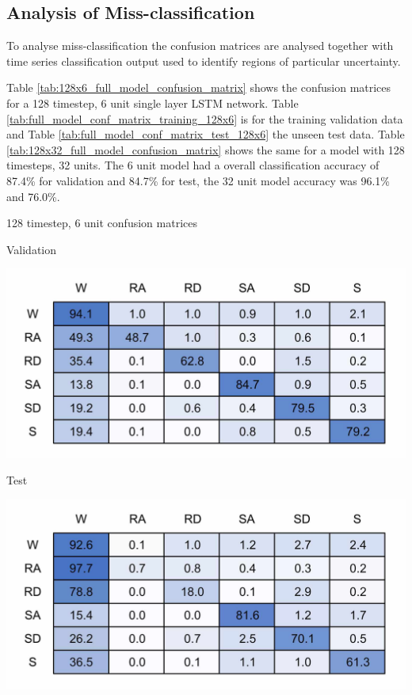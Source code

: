 \documentclass[sensors,article,submit,moreauthors,pdftex]{Definitions/mdpi}
\begin{document}
\subsection{Analysis of Miss-classification}

To analyse miss-classification the confusion matrices are analysed together with time series classification output used to identify regions of particular uncertainty.

Table \ref{tab:128x6_full_model_confusion_matrix} shows the confusion matrices for a 128 timestep, 6 unit single layer LSTM network. Table \ref{tab:full_model_conf_matrix_training_128x6} is for the training validation data and Table \ref{tab:full_model_conf_matrix_test_128x6} the unseen test data. Table \ref{tab:128x32_full_model_confusion_matrix} shows the same for a model with 128 timesteps, 32 units. The 6 unit model had a overall classification accuracy of 87.4\% for validation and 84.7\% for test, the 32 unit model accuracy was 96.1\% and 76.0\%.

\begin{table}[!hbt]
    \centering
    \caption{128 timestep, 6 unit confusion matrices}
    \label{tab:128x6_full_model_confusion_matrix}
    \begin{subtable}{.45\textwidth}
        \centering
        \caption{Validation}
        \label{tab:full_model_conf_matrix_training_128x6}
        \includegraphics[width=\textwidth]{Figures/results/conf_matricies/Training_128x6_NT.jpg}
    \end{subtable}
    \hfil
    \begin{subtable}{.45\textwidth}
        \centering
        \caption{Test}
        \label{tab:full_model_conf_matrix_test_128x6}
        \includegraphics[width=\textwidth]{Figures/results/conf_matricies/Test_128x6_NT.jpg}
    \end{subtable}
\end{table}
\end{document}
